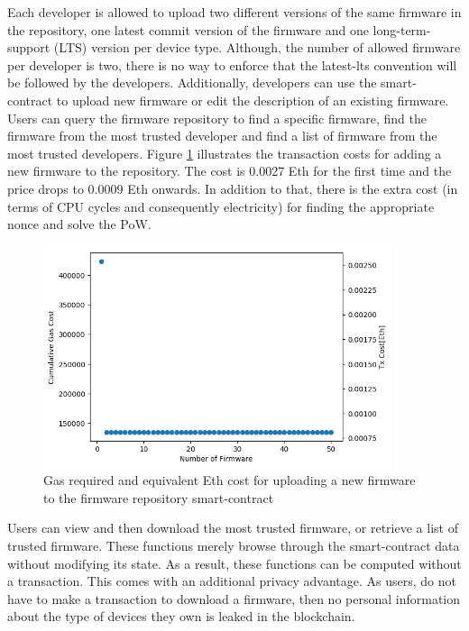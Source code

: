 {{{Each developer is allowed to upload two different versions of the same firmware in the repository, one latest commit version of the firmware and one long-term-support (LTS) version per device type. Although, the number of allowed firmware per developer is two, there is no way to enforce that the latest-lts convention will be followed by the developers. Additionally, developers can use the smart-contract to upload new firmware or edit the description of an existing firmware. Users can query the firmware repository to find a specific firmware, find the firmware from the most trusted developer and find a list of firmware from the most trusted developers. Figure \ref{fig:addGasC} illustrates the transaction costs for adding a new firmware to the repository. The cost is 0.0027 Eth for the first time and the price drops to 0.0009 Eth onwards. In addition to that, there is the extra cost (in terms of CPU cycles and consequently electricity) for finding the appropriate nonce and solve the PoW.

\begin{figure}[htb!]
\centering
\includegraphics[width=0.91\textwidth]{./pics/add_firmware.png}
\caption{Gas required and equivalent Eth cost for uploading a new firmware to the firmware repository smart-contract}
\label{fig:addGasC}
\end{figure}

}

Users can view and then download the most trusted firmware, or retrieve a list of trusted firmware. These functions merely browse through the smart-contract data without modifying its state. As a result, these functions can be computed without a transaction. This comes with an additional privacy advantage. As users, do not have to make a transaction to download a firmware, then no personal information about the type of devices they own is leaked in the blockchain.

}}
